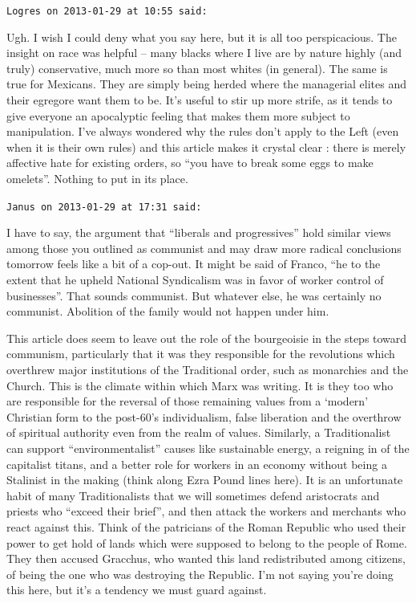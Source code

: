 \begin{footnotesize}
\begin{sffamily}
\texttt{Logres on 2013-01-29 at 10:55 said:}

Ugh. I wish I could deny what you say here, but it is all too perspicacious. The insight on race was helpful -- many blacks where I live are by nature highly (and truly) conservative, much more so than most whites (in general). The same is true for Mexicans. They are simply being herded where the managerial elites and their egregore want them to be. It's useful to stir up more strife, as it tends to give everyone an apocalyptic feeling that makes them more subject to manipulation. I've always wondered why the rules don't apply to the Left (even when it is their own rules) and this article makes it crystal clear : there is merely affective hate for existing orders, so ``you have to break some eggs to make omelets''. Nothing to put in its place.

\hfill

\texttt{Janus on 2013-01-29 at 17:31 said:}

I have to say, the argument that ``liberals and progressives'' hold similar views among those you outlined as communist and may draw more radical conclusions tomorrow feels like a bit of a cop-out. It might be said of Franco, ``he to the extent that he upheld National Syndicalism was in favor of worker control of businesses''. That sounds communist. But whatever else, he was certainly no communist. Abolition of the family would not happen under him.

This article does seem to leave out the role of the bourgeoisie in the steps toward communism, particularly that it was they responsible for the revolutions which overthrew major institutions of the Traditional order, such as monarchies and the Church. This is the climate within which Marx was writing. It is they too who are responsible for the reversal of those remaining values from a `modern' Christian form to the post-60's individualism, false liberation and the overthrow of spiritual authority even from the realm of values. Similarly, a Traditionalist can support ``environmentalist'' causes like sustainable energy, a reigning in of the capitalist titans, and a better role for workers in an economy without being a Stalinist in the making (think along Ezra Pound lines here). It is an unfortunate habit of many Traditionalists that we will sometimes defend aristocrats and priests who ``exceed their brief'', and then attack the workers and merchants who react against this. Think of the patricians of the Roman Republic who used their power to get hold of lands which were supposed to belong to the people of Rome. They then accused Gracchus, who wanted this land redistributed among citizens, of being the one who was destroying the Republic. I'm not saying you're doing this here, but it's a tendency we must guard against.


\end{sffamily}
\end{footnotesize}
